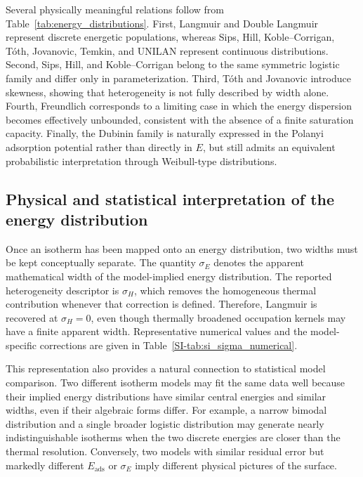 \documentclass[journal=jacsat,manuscript=article]{achemso}
\begin{document}
	Several physically meaningful relations follow from Table~\ref{tab:energy_distributions}. First, Langmuir and Double Langmuir represent discrete energetic populations, whereas Sips, Hill, Koble--Corrigan, T\'{o}th, Jovanovic, Temkin, and UNILAN represent continuous distributions. Second, Sips, Hill, and Koble--Corrigan belong to the same symmetric logistic family and differ only in parameterization. Third, T\'{o}th and Jovanovic introduce skewness, showing that heterogeneity is not fully described by width alone. Fourth, Freundlich corresponds to a limiting case in which the energy dispersion becomes effectively unbounded, consistent with the absence of a finite saturation capacity. Finally, the Dubinin family is naturally expressed in the Polanyi adsorption potential rather than directly in $E$, but still admits an equivalent probabilistic interpretation through Weibull-type distributions.
	
	\subsection{Physical and statistical interpretation of the energy distribution}
	\label{sec:sigma_E}
	
	Once an isotherm has been mapped onto an energy distribution, two widths must be
kept conceptually separate. The quantity $\sigma_E$ denotes the apparent
mathematical width of the model-implied energy distribution. The reported
heterogeneity descriptor is $\sigma_H$, which removes the homogeneous thermal
contribution whenever that correction is defined. Therefore, Langmuir is
recovered at $\sigma_H=0$, even though thermally broadened occupation kernels
may have a finite apparent width. Representative numerical values and the
model-specific corrections are given in Table~\ref{SI-tab:si_sigma_numerical}.

	This representation also provides a natural connection to statistical model comparison. Two different isotherm models may fit the same data well because their implied energy distributions have similar central energies and similar widths, even if their algebraic forms differ. For example, a narrow bimodal distribution and a single broader logistic distribution may generate nearly indistinguishable isotherms when the two discrete energies are closer than the thermal resolution. Conversely, two models with similar residual error but markedly different $E_{\mathrm{ads}}$ or $\sigma_E$ imply different physical pictures of the surface.
	
\end{document}
